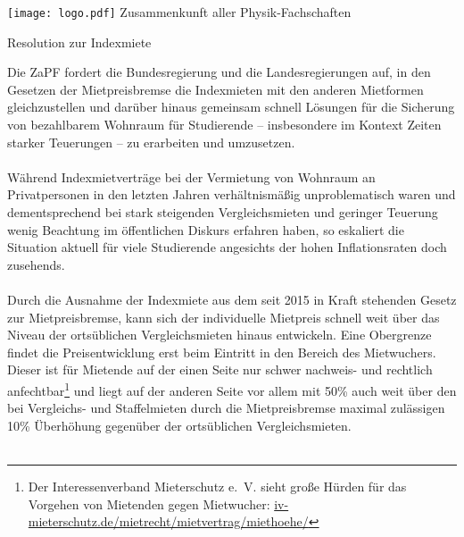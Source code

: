 \documentclass[DIV=calc]{scrartcl}
\begin{document}
\hspace{0.87\textwidth}
\begin{minipage}{120pt}
	\vspace{-1.8cm}
	\texttt{[image: logo.pdf]}
	\centering
	\small Zusammenkunft aller Physik-Fachschaften
\end{minipage}

\begin{center}
  \huge{Resolution zur Indexmiete}\vspace{.25\baselineskip}\\
  \normalsize
\end{center}
\vspace{1cm}

Die ZaPF fordert die Bundesregierung und die Landesregierungen auf, in den Gesetzen der Mietpreisbremse die Indexmieten mit den anderen Mietformen gleichzustellen und darüber hinaus gemeinsam schnell Lösungen für die Sicherung von bezahlbarem Wohnraum für Studierende – insbesondere im Kontext Zeiten starker Teuerungen – zu erarbeiten und umzusetzen.\\\\
Während Indexmietverträge bei der Vermietung von Wohnraum an Privatpersonen in den letzten Jahren verhältnismäßig unproblematisch waren und dementsprechend bei stark steigenden Vergleichsmieten und geringer Teuerung wenig Beachtung im öffentlichen Diskurs erfahren haben, so eskaliert die Situation aktuell für viele Studierende angesichts der hohen Inflationsraten doch zusehends.\\\\
Durch die Ausnahme der Indexmiete aus dem seit 2015 in Kraft stehenden Gesetz zur Mietpreisbremse, kann sich der individuelle Mietpreis schnell weit über das Niveau der ortsüblichen Vergleichsmieten hinaus entwickeln. Eine Obergrenze findet die Preisentwicklung erst beim Eintritt in den Bereich des Mietwuchers. Dieser ist für Mietende auf der einen Seite nur schwer nachweis- und rechtlich anfechtbar\footnote{Der Interessenverband Mieterschutz e. V. sieht große Hürden für das Vorgehen von Mietenden gegen Mietwucher: \href{https://www.iv-mieterschutz.de/mietrecht/mietvertrag/miethoehe/}{iv-mieterschutz.de/mietrecht/mietvertrag/miethoehe/}} und liegt auf der anderen Seite vor allem mit 50\% auch weit über den bei Vergleichs- und Staffelmieten durch die Mietpreisbremse maximal zulässigen 10\% Überhöhung gegenüber der ortsüblichen Vergleichsmieten.\\\\
\end{document}
